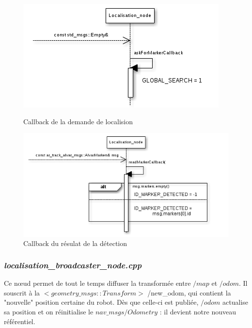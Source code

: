 \documentclass[10pt,a4paper]{article}
\begin{document}
\begin{figure}
 \begin{minipage}[b]{.48\linewidth}
\includegraphics[scale=0.5]{figures/locacbask.png} 
  \caption{Callback de la demande de localision}
 \end{minipage} \hfill
 \begin{minipage}[b]{.46\linewidth}
\includegraphics[scale=0.5]{figures/locacb2read.png} 
  \caption{Callback du résulat de la détection}
 \end{minipage}
\end{figure}
\subsubsection{\textit{localisation\_broadcaster\_node.cpp}}

Ce nœud permet de tout le temps diffuser la transformée entre $/map$ et $/odom$. Il souscrit à la $<geometry\_msgs::Transform>$ /new\_odom, qui contient la "nouvelle" position certaine du robot. Dès que celle-ci est publiée, $/odom$ actualise sa position et on réinitialise le $nav\_msgs/Odometry$ : il devient notre nouveau référentiel.
\end{document}
